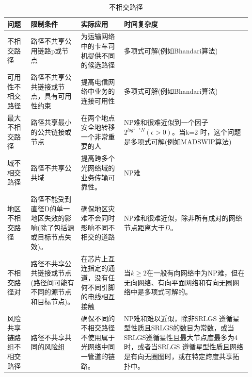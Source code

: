 \begin{table}[htbp]
\caption{不相交路径}\label{tab:disjointPath}
\vspace{0.5em}\centering\wuhao
\begin{tabularx}{46em}{|*{4}{>{\centering\arraybackslash}X|}}
\toprule[1.5pt]
问题   & 限制条件   & 实际应用 & 时间复杂度  \\
\midrule[1pt]
不相交路径 & 路径不共享公用链路p或节点 & 为运输网络中的卡车司机提供不同的候选路径 & 多项式可解(例如Bhandari算法\cite{bhandari1997optimal})\\
\hline
可用性不相交路径 & 路径不共享公共链接或节点，具有可用性约束 & 提高电信网络中业务的连接可用性 & 多项式可解(例如Bhandari算法\cite{bhandari1997optimal})\\
\hline
最大不相交路径 & 路径共享最小的公共链接或节点 & 在两个地点安全地转移一个非常重要的人 & NP难和很难近似到一个因子$2^{log^{1-\epsilon}N}(\epsilon>0)$。当k=2 时，这个问题是多项式可解(例如MADSWIP算法\cite{taft1999quality})\\
\hline
域不相交路径 & 路径不共享公共域 & 提高跨多个光网络域的业务传输可靠性。 & NP难\cite{gao2013domain}\\
\hline
地区不相交路径 & 路径不能受到直径D的单一地区失效的影响(除了包括源或目标节点失效)。 & 确保地区灾难不会同时影响不同不相交的道路 & NP难和很难近似\cite{trajanovski2015finding}，除非所有成对的网络节点距离大于$D$。\\
\hline
不相交路径对 & 路径不共享公共链接或节点(路径间可能有不同的源节点和目标节点)。 & 在芯片上互连指定的通道，没有任何不同引脚的电线相互接触 & 当$k\geq2$在一般有向网络中为NP难\cite{fortune1980directed}，但在无向网络\cite{robertson1995graph}、有向平面网络\cite{schrijver1994finding}和有向无圈网络中\cite{fortune1980directed}是多项式可解的。 \\
\hline
风险共享链路组不相交路径 & 路径不共享共同的风险组 & 确保不同的不相交路径不使用属于光网络中同一管道的链路。 & NP难\cite{hu2003diverse}和难以近似\cite{coudert2007shared}，除非SRLGS 遵循星型性质且SRLGS的数目为常数\cite{bermond2013srlg}，或当SRLGS遵循星性且最大节点度最多为4\cite{bermond2013srlg}时，或者当SRLGS 遵循星型性质且网络是有向无圈图\cite{bermond2013srlg}时，或在特定跨度共享拓扑\cite{bhandari1994optimal}中。\\
\bottomrule[1.5pt]
\end{tabularx}
\vspace{\baselineskip}
\end{table}
